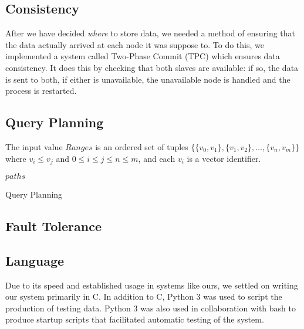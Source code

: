 \subsection{Consistency}
After we have decided \emph{where} to store data, we needed a method of ensuring that the data actually arrived at each node it was suppose to.
To do this, we implemented a system called Two-Phase Commit (TPC) which ensures data consistency.
It does this by checking that both slaves are available: if so, the data is sent to both, if either is unavailable, the unavailable node is handled and the process is restarted.
%
\subsection{Query Planning}
The input value $Ranges$ is an ordered set of tuples $\{\{v_0,v_1\},\{v_1,v_2\},\ldots,\{v_n,v_m\}\}$ where $v_i\leq v_j$ and $0\leq i\leq j\leq n\leq m$, and each $v_i$ is a vector identifier.
\begin{algorithm}
    \begin{algorithmic}

                  \Else
                  \EndIf
                \EndFor
          \EndFor
          \Return $paths$
    \end{algorithmic}
    \caption{Query Planning}
\end{algorithm}
%
\subsection{Fault Tolerance}
%
\subsection{Language}
Due to its speed and established usage in systems like ours, we settled on writing our system primarily in C.
In addition to C, Python 3 was used to script the production of testing data.
Python 3 was also used in collaboration with bash to produce startup scripts that facilitated automatic testing of the system.
